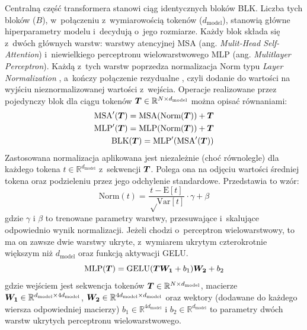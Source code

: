 Centralną część transformera stanowi ciąg identycznych bloków BLK. Liczba tych bloków ($B$), w~połączeniu z~wymiarowością tokenów ($d_{\mathrm{model}}$), stanowią główne hiperparametry modelu i~decydują o~jego rozmiarze. Każdy blok składa się z~dwóch głównych warstw: warstwy atencyjnej MSA (ang. \emph{Mulit-Head Self-Attention}) i~niewielkiego perceptronu wielowarstwowego MLP (ang.  \emph{Mulitlayer Perceptron}). Każdą z~tych warstw poprzedza normalizacja Norm typu \emph{Layer Normalization} \cite{ba_layer_2016}, a~kończy połączenie rezydualne \cite{he_deep_2015}, czyli dodanie do wartości na wyjściu nieznormalizowanej wartości z~wejścia. Operacje realizowane przez pojedynczy blok dla ciągu tokenów $\boldsymbol{T} \in \mathbb{R}^{N \times d_{\mathrm{model}}}$ można opisać równaniami:
\begin{eqnarray}
     \textrm{MSA}'(\boldsymbol{T}) = \textrm{MSA}(\textrm{Norm}(\boldsymbol{T})) + \boldsymbol{T} \\
     \textrm{MLP}'(\boldsymbol{T}) = \textrm{MLP}(\textrm{Norm}(\boldsymbol{T})) + \boldsymbol{T} \\
     \textrm{BLK}(\boldsymbol{T}) = \textrm{MLP}'(\textrm{MSA}'(\boldsymbol{T}))
\end{eqnarray}
Zastosowana normalizacja aplikowana jest niezależnie (choć równolegle) dla każdego tokena $t \in \mathbb{R}^{d_{\mathrm{model}}}$ z~sekwencji $\boldsymbol{T}$. Polega ona na odjęciu wartości średniej tokena oraz podzieleniu przez jego odchylenie standardowe. Przedstawia to wzór:
\begin{equation}
    \textrm{Norm}(t) = \frac{t - \textrm{E}[t]}{\sqrt \textrm{Var}[t]} \cdot \gamma + \beta
\end{equation}
gdzie $\gamma$ i $\beta$ to trenowane parametry warstwy, przesuwające i~skalujące odpowiednio wynik normalizacji. Jeżeli chodzi o~perceptron wielowarstwowy, to ma on zawsze dwie warstwy ukryte, z~wymiarem ukrytym czterokrotnie większym niż $d_{\mathrm{model}}$ oraz funkcją aktywacji GELU.
\begin{equation}
    \textrm{MLP}(\boldsymbol{T}) = \textrm{GELU}(\boldsymbol{T}\boldsymbol{W_1} + b_1)\boldsymbol{W_2} + b_2
\end{equation}
gdzie wejściem jest sekwencja tokenów $\boldsymbol{T} \in \mathbb{R}^{N \times d_{\mathrm{model}}}$, macierze $\boldsymbol{W_1} \in \mathbb{R}^{d_{\mathrm{model}} \times 4d_{\mathrm{model}}}$, $\boldsymbol{W_2} \in \mathbb{R}^{4d_{\mathrm{model}} \times d_{\mathrm{model}}}$ oraz wektory (dodawane do każdego wiersza odpowiedniej macierzy) $b_1 \in \mathbb{R}^{4d_{\mathrm{model}}}$ i $b_2 \in \mathbb{R}^{d_{\mathrm{model}}}$ to parametry dwóch warstw ukrytych perceptronu wielowarstwowego.

